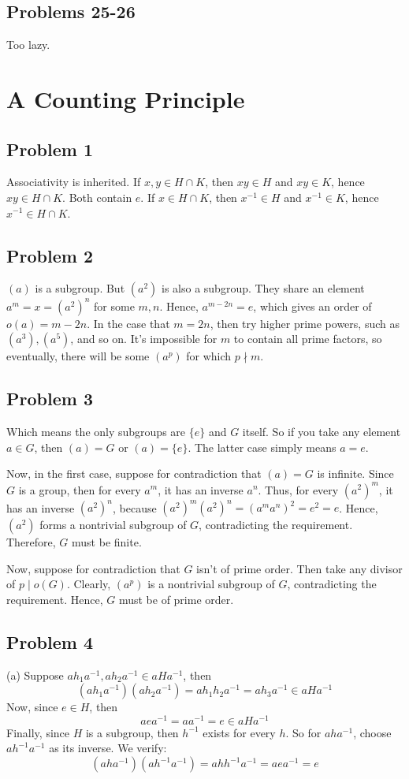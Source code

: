 \documentclass{book}
\begin{document}
\subsection*{Problems 25-26}
Too lazy.

\section{A Counting Principle}

\subsection*{Problem 1}
Associativity is inherited. If $x, y \in H \cap K$, then $xy \in H$ and $xy \in K$, hence $xy \in H \cap K$. Both contain $e$. If $x \in H \cap K$, then $x^{-1} \in H$ and $x^{-1} \in K$, hence $x^{-1} \in H \cap K$.

\subsection*{Problem 2}
$(a)$ is a subgroup. But $(a^2)$ is also a subgroup. They share an element $a^m = x = (a^2)^n$ for some $m, n$. Hence, $a^{m - 2n} = e$, which gives an order of $o(a) = m - 2n$. In the case that $m = 2n$, then try higher prime powers, such as $(a^3), (a^5)$, and so on. It's impossible for $m$ to contain all prime factors, so eventually, there will be some $(a^p)$ for which $p \nmid m$.

\subsection*{Problem 3}
Which means the only subgroups are $\{ e \}$ and $G$ itself. So if you take any element $a \in G$, then $(a) = G$ or $(a) = \{ e \}$. The latter case simply means $a = e$.

Now, in the first case, suppose for contradiction that $(a) = G$ is infinite. Since $G$ is a group, then for every $a^m$, it has an inverse $a^n$. Thus, for every $(a^2)^m$, it has an inverse $(a^2)^n$, because $(a^2)^m (a^2)^n = (a^m a^n)^2 = e^2 = e$. Hence, $(a^2)$ forms a nontrivial subgroup of $G$, contradicting the requirement. Therefore, $G$ must be finite.

Now, suppose for contradiction that $G$ isn't of prime order. Then take any divisor of $p \mid o(G)$. Clearly, $(a^p)$ is a nontrivial subgroup of $G$, contradicting the requirement. Hence, $G$ must be of prime order.

\subsection*{Problem 4}
(a)
Suppose $ah_1a^{-1}, ah_2a^{-1} \in aHa^{-1}$, then
$$(ah_1a^{-1})(ah_2a^{-1}) = ah_1h_2a^{-1} = ah_3a^{-1} \in aHa^{-1}$$
Now, since $e \in H$, then
$$aea^{-1} = aa^{-1} = e \in aHa^{-1}$$
Finally, since $H$ is a subgroup, then $h^{-1}$ exists for every $h$. So for $aha^{-1}$, choose $ah^{-1}a^{-1}$ as its inverse. We verify:
$$(aha^{-1})(ah^{-1}a^{-1}) = ahh^{-1}a^{-1} = aea^{-1} = e$$
\end{document}
